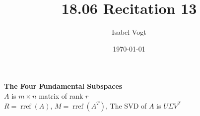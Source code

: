 \documentclass[11pt]{article}
\title{18.06 Recitation 13}
\author{Isabel Vogt}
\date{\today}                                           %
\begin{document}

\begin{center}
\textbf{The Four Fundamental Subspaces} \\
$A$ is $m \times n$ matrix of rank $r$ \\
$R = \operatorname{rref}(A)$,
$M = \operatorname{rref}(A^T)$, \qquad
The SVD of $A$ is $U \Sigma V^T$
\end{center}
\end{document}
